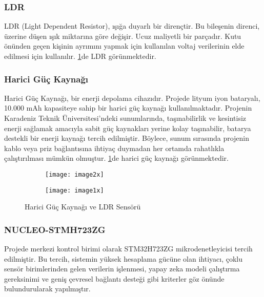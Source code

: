 \subsubsection{LDR}

LDR (Light Dependent Resistor), ışığa duyarlı bir dirençtir. Bu bileşenin direnci, üzerine düşen ışık miktarına göre değişir. Ucuz maliyetli bir parçadır. Kutu önünden geçen kişinin ayrımını yapmak için kullanılan voltaj verilerinin elde edilmesi için kullanılır. \ref{fig:pow_ldr}de LDR görünmektedir.



\subsubsection{Harici Güç Kaynağı}
Harici Güç Kaynağı, bir enerji depolama cihazıdır. Projede lityum iyon bataryalı, 10.000 mAh kapasiteye sahip bir harici güç kaynağı kullanılmaktadır. Projenin Karadeniz Teknik Üniversitesi’ndeki sunumlarında, taşınabilirlik ve kesintisiz enerji sağlamak amacıyla sabit güç kaynakları yerine kolay taşınabilir, batarya destekli bir enerji kaynağı tercih edilmiştir. Böylece, sunum sırasında projenin kablo veya priz bağlantısına ihtiyaç duymadan her ortamda rahatlıkla çalıştırılması mümkün olmuştur.  \ref{fig:pow_ldr}de harici güç kaynağı görünmektedir.

\begin{figure}[H]
    \centering
    \begin{subfigure}{0.45\textwidth}
        \centering
        \texttt{[image: image2x]} %
    \end{subfigure}
    \hfill
    \begin{subfigure}{0.45\textwidth}
        \centering
        \texttt{[image: image1x]} %
    \end{subfigure}
    \caption{Harici Güç Kaynağı ve LDR Sensörü}
    \label{fig:pow_ldr}
\end{figure}

\subsubsection{NUCLEO-STMH723ZG}
Projede merkezi kontrol birimi olarak STM32H723ZG mikrodenetleyicisi tercih edilmiştir. Bu tercih, sistemin yüksek hesaplama gücüne olan ihtiyacı, çoklu sensör birimlerinden gelen verilerin işlenmesi, yapay zeka modeli çalıştırma gereksinimi ve geniş çevresel bağlantı desteği gibi kriterler göz önünde bulundurularak yapılmıştır. 

